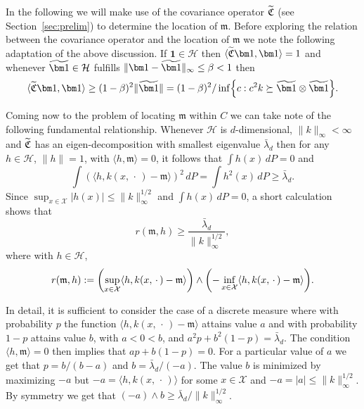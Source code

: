 \documentclass[AHL,Unicode,longabstracts,published]{cedram}
\theoremstyle{remark}
\newcommand{\X}{\mathcal{X}}
\newcommand{\cH}{\mathcal{H}}
\newcommand{\fkC}{\mathfrak{C}}
\newcommand{\Cov}{\tilde{\fkC}}
\newcommand{\mean}{\mathfrak{m}}
\let\oldtilde\tilde
\renewcommand*{\tilde}[1]{\mathchoice{\widetilde{#1}}{\widetilde{#1}}{\oldtilde{#1}}{\oldtilde{#1}}}
\let\originalleft\left
\let\originalright\right
\renewcommand{\left}{\mathopen{}\mathclose\bgroup\originalleft}
\renewcommand{\right}{\aftergroup\egroup\originalright}
\begin{document}
In the following we will make use of the covariance operator $\tilde{\fkC}$ (see Section~\ref{sec:prelim}) to determine the location of $\mean$. Before exploring the relation between the covariance operator and the location of $\mean$ we note the following adaptation of the above discussion. If $\bm 1 \in \cH$ then $\langle \Cov \bm 1, \bm 1 \rangle = 1$ and whenever $\tilde{\bm 1} \in \cH$ fulfills $\|\bm 1 - \tilde{\bm 1}\|_\infty \leq \beta < 1$ then
\begin{equation}\label{lbnd:cov_op}
\langle \Cov \bm 1, \bm 1 \rangle \geq (1-\beta)^2 \|\tilde{\bm 1}\| = (1-\beta)^2/ \inf\left\{ c: c^2 k \succeq \tilde{\bm 1} \otimes \tilde{\bm 1}\right\}.
\end{equation}



Coming now to the problem of locating $\mean$ within $C$ we can take note of the following fundamental relationship. Whenever $\cH$ is $d$-dimensional, $\|k\|_\infty <\infty$ and $\tilde{\fkC}$ has an eigen-decomposition with smallest eigenvalue $\bar \lambda_d$ then for any $h \in \cH$, $\|h\|=1$, with $\langle h, \mean \rangle = 0$, it follows that $\int h(x) \, dP = 0$ and
\[
\int (\langle h, k(x,\,\cdot\,) - \mean \rangle)^2 \, dP = \int h^2(x) \, dP \geq \bar \lambda_d.
\]
Since $\sup_{x\in\X} |h(x)| \leq \|k\|_\infty^{1/2}$ and $\int h(x) \, dP = 0$, a short calculation shows that
\[
r(\mean,h) \geq \frac{\bar{\lambda}_d}{\|k\|_\infty^{1/2}},
\]
where with $h \in \cH$,
\[
r(\mean,h) := \left(\sup_{x\in \X} \langle h, k(x,\,\cdot\,) - \mean \rangle\right) \wedge \left(- \inf_{x\in \X} \langle h, k(x,\,\cdot\,) - \mean \rangle\right).
\]



In detail, it is sufficient to consider the case of a discrete measure where with probability $p$ the function $\langle h, k(x,\,\cdot\,) - \mean \rangle$ attains value $a$ and with probability $1-p$ attains value $b$, with $a < 0 < b$, and $a^2 p + b^2 (1-p) = \bar \lambda_d$. The condition $\langle h,\mean \rangle = 0$ then implies that $a p + b(1-p) = 0$. For a particular value of $a$ we get that $p=b/(b-a)$ and $b = \bar \lambda_d/(-a)$. The value $b$ is minimized by maximizing $-a$ but $-a = \langle h,k(x,\,\cdot\,) \rangle$ for some $x \in \X$ and $-a = |a| \leq \|k\|_\infty^{1/2}$. By symmetry we get that $(- a) \wedge b \geq \bar \lambda_d/\|k\|_\infty^{1/2}$.
\end{document}
